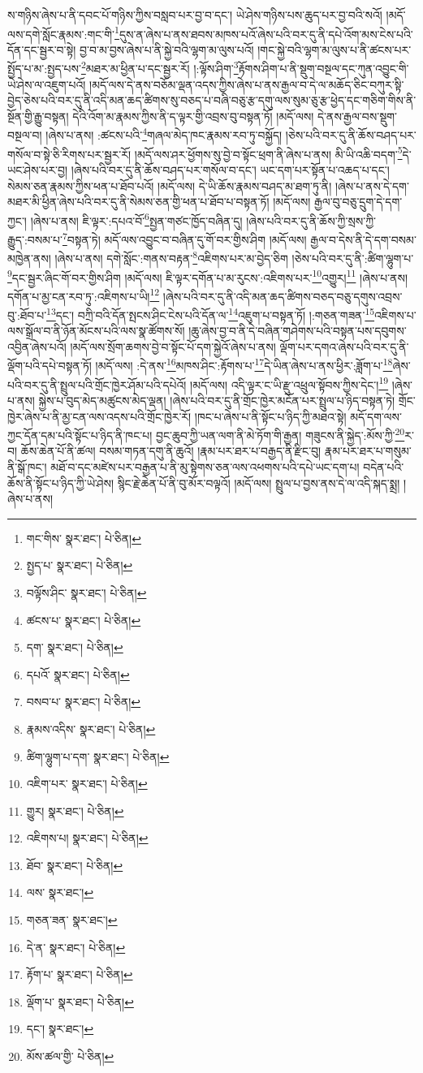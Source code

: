 ས་གཉིས་ཞེས་པ་ནི་དབང་པོ་གཉིས་ཀྱིས་བསླབ་པར་བྱ་བ་དང་། ཡེ་ཤེས་གཉིས་པས་ཆུད་པར་བྱ་བའི་སའོ། །མདོ་ལས་དགེ་སློང་རྣམས་:གང་གི་\footnote{གང་གིས་  སྣར་ཐང་།  པེ་ཅིན། }དུས་ན་ཞེས་པ་ནས་ཐབས་མཁས་པའོ་ཞེས་པའི་བར་དུ་ནི་དཔེ་འོག་མས་ངེས་པའི་དོན་དང་སྦྱར་བ་སྟེ། བྱ་བ་མ་བྱས་ཞེས་པ་ནི་སྐྱེ་བའི་ལྷག་མ་ལུས་པའོ། །གང་སྐྱེ་བའི་ལྷག་མ་ལུས་པ་ནི་ཚངས་པར་སྤྱོད་པ་མ་:སྤྱད་པས་\footnote{སྤྱད་པ་  སྣར་ཐང་།  པེ་ཅིན། }མཐར་མ་ཕྱིན་པ་དང་སྦྱར་རོ། །:ལྟོས་ཤིག་\footnote{བལྟོས་ཤིང་  སྣར་ཐང་།  པེ་ཅིན། }རྟོགས་ཤིག་པ་ནི་སྡུག་བསྔལ་དང་ཀུན་འབྱུང་གི་ཡེ་ཤེས་ལ་འཇུག་པའོ། །མདོ་ལས་དེ་ནས་བཅོམ་ལྡན་འདས་ཀྱིས་ཞེས་པ་ནས་རྒྱལ་བ་དེ་ལ་མཆོད་ཅིང་བཀུར་སྟི་བྱེད་ཅེས་པའི་བར་དུ་ནི་འདི་མན་ཆད་ཚིགས་སུ་བཅད་པ་བཞི་བཅུ་རྩ་དགུ་ལས་སུམ་ཅུ་རྩ་ཕྱེད་དང་གཅིག་གིས་ནི་སྔོན་གྱི་རྒྱུ་བསྟན། དེའི་འོག་མ་རྣམས་ཀྱིས་ནི་ད་ལྟར་གྱི་འབྲས་བུ་བསྟན་ཏོ། །མདོ་ལས། དེ་ནས་རྒྱལ་བས་སྡུག་བསྔལ་བ། །ཞེས་པ་ནས། :ཚངས་པའི་\footnote{ཚངས་པ་  སྣར་ཐང་།  པེ་ཅིན། }གཞལ་མེད་ཁང་རྣམས་རབ་ཏུ་བསྐྱོད། །ཅེས་པའི་བར་དུ་ནི་ཆོས་བཤད་པར་གསོལ་བ་སྟེ་ཅི་རིགས་པར་སྦྱར་རོ། །མདོ་ལས་ཤར་ཕྱོགས་སུ་བྱེ་བ་སྟོང་ཕྲག་ནི་ཞེས་པ་ནས། མི་ཡི་འཆི་བདག་\footnote{དག་  སྣར་ཐང་།  པེ་ཅིན། }དེ་ཡང་ཤེས་པར་བྱ། །ཞེས་པའི་བར་དུ་ནི་ཆོས་བཤད་པར་གསོལ་བ་དང་། ཡང་དག་པར་སྟོན་པ་འཆད་པ་དང་། སེམས་ཅན་རྣམས་ཀྱིས་ཕན་པ་ཐོབ་པའོ། །མདོ་ལས། དེ་ཡི་ཆོས་རྣམས་བཤད་མ་ཐག་ཏུ་ནི། །ཞེས་པ་ནས་དེ་དག་མཐར་མི་ཕྱིན་ཞེས་པའི་བར་དུ་ནི་སེམས་ཅན་གྱི་ཕན་པ་ཐོབ་པ་བསྟན་ཏོ། །མདོ་ལས། རྒྱལ་བུ་བཅུ་དྲུག་དེ་དག་ཀྱང་། །ཞེས་པ་ནས། ཇི་ལྟར་:དཔའ་བོ་\footnote{དཔའོ་  སྣར་ཐང་།  པེ་ཅིན། }སྤྱན་གཙང་ཁྱོད་བཞིན་དུ། །ཞེས་པའི་བར་དུ་ནི་ཆོས་ཀྱི་སྲས་ཀྱི་རྒྱུད་:བསམ་པ་\footnote{བསབ་པ་  སྣར་ཐང་།  པེ་ཅིན། }བསྟན་ཏེ། མདོ་ལས་འབྱུང་བ་བཞིན་དུ་གོ་བར་གྱིས་ཤིག །མདོ་ལས། རྒྱལ་བ་དེས་ནི་དེ་དག་བསམ་མཁྱེན་ནས། །ཞེས་པ་ནས། དགེ་སློང་:གནས་བརྟན་\footnote{རྣམས་འདིས་  སྣར་ཐང་།  པེ་ཅིན། }འཇིགས་པར་མ་བྱེད་ཅིག །ཅེས་པའི་བར་དུ་ནི་:ཚིག་ལྷུག་པ་\footnote{ཚིག་ལྷུག་པ་དག་  སྣར་ཐང་།  པེ་ཅིན། }དང་སྦྱར་ཞིང་གོ་བར་གྱིས་ཤིག །མདོ་ལས། ཇི་ལྟར་དགོན་པ་མ་རུངས་:འཇིགས་པར་\footnote{འཇིག་པར་  སྣར་ཐང་།  པེ་ཅིན། }འགྱུར།\footnote{གྱུར།  སྣར་ཐང་།  པེ་ཅིན། } །ཞེས་པ་ནས། དགོན་པ་མྱ་ངན་རབ་ཏུ་:འཇིགས་པ་ཡི།\footnote{འཇིགས་པ།  སྣར་ཐང་།  པེ་ཅིན། } །ཞེས་པའི་བར་དུ་ནི་འདི་མན་ཆད་ཚིགས་བཅད་བཅུ་དགུས་འབྲས་བུ་:ཐོབ་པ་\footnote{ཐོབ་  སྣར་ཐང་།  པེ་ཅིན། }དང་། བཀྲི་བའི་དོན་སྤངས་ཤིང་ངེས་པའི་དོན་ལ་\footnote{ལས་  སྣར་ཐང་། }འཇུག་པ་བསྟན་ཏོ། །:གཅན་གཟན་\footnote{གཅན་ཟན་  སྣར་ཐང་། }འཇིགས་པ་ལས་སྒྲོལ་བ་ནི་ཉོན་མོངས་པའི་ལས་སྣ་ཚོགས་སོ། །ཆུ་ཞེས་བྱ་བ་ནི་དེ་བཞིན་གཤེགས་པའི་བསྟན་པས་དབུགས་འབྱིན་ཞེས་པའོ། །མདོ་ལས་སྲོག་ཆགས་བྱེ་བ་སྟོང་པོ་དག་སྐྱེའོ་ཞེས་པ་ནས། ལྡོག་པར་དགའ་ཞེས་པའི་བར་དུ་ནི་ལྡོག་པའི་དཔེ་བསྟན་ཏོ། །མདོ་ལས། :དེ་ནས་\footnote{དེ་ན་  སྣར་ཐང་།  པེ་ཅིན། }མཁས་ཤིང་:རྟོགས་པ་\footnote{རྟོག་པ་  སྣར་ཐང་།  པེ་ཅིན། }དེ་ཡིན་ཞེས་པ་ནས་ཕྱིར་:ཟློག་པ་\footnote{ལྡོག་པ་  སྣར་ཐང་།  པེ་ཅིན། }ཞེས་པའི་བར་དུ་ནི་སྤྲུལ་པའི་གྲོང་ཁྱེར་ཤོམ་པའི་དཔེའོ། །མདོ་ལས། འདི་ལྟར་ང་ཡི་རྫུ་འཕྲུལ་སྟོབས་ཀྱིས་དེང་།\footnote{དང་།  སྣར་ཐང་། } །ཞེས་པ་ནས། སྐྱེས་པ་བུད་མེད་མཚུངས་མེད་ལྡན། །ཞེས་པའི་བར་དུ་ནི་གྲོང་ཁྱེར་མངོན་པར་སྤྲུལ་པ་ཉིད་བསྟན་ཏེ། གྲོང་ཁྱེར་ཞེས་པ་ནི་མྱ་ངན་ལས་འདས་པའི་གྲོང་ཁྱེར་རོ། །ཁང་པ་ཞེས་པ་ནི་སྟོང་པ་ཉིད་ཀྱི་མཐའ་སྟེ། མདོ་དག་ལས་ཀྱང་དོན་དམ་པའི་སྟོང་པ་ཉིད་ནི་ཁང་པ། བྱང་ཆུབ་ཀྱི་ཡན་ལག་ནི་མེ་ཏོག་གི་རྒྱན། གཟུངས་ནི་སྐྱེད་:མོས་ཀྱི་\footnote{མོས་ཚལ་གྱི་  པེ་ཅིན། }ར་བ། ཆོས་ཆེན་པོ་ནི་ཚལ། བསམ་གཏན་དགུ་ནི་ཆུའོ། །རྣམ་པར་ཐར་པ་བརྒྱད་ནི་རྫིང་བུ། རྣམ་པར་ཐར་པ་གསུམ་ནི་སྒོ་ཁང་། མཐོ་བ་དང་མཛེས་པར་བརྒྱན་པ་ནི་མུ་སྟེགས་ཅན་ལས་འཕགས་པའི་དཔེ་ཡང་དག་པ། བདེན་པའི་ཆོས་ནི་སྟོང་པ་ཉིད་ཀྱི་ཡེ་ཤེས། སྙིང་རྗེ་ཆེན་པོ་ནི་བུ་མོར་བལྟའོ། །མདོ་ལས། སྤྲུལ་པ་བྱས་ནས་དེ་ལ་འདི་སྐད་སྨྲ། །ཞེས་པ་ནས། 